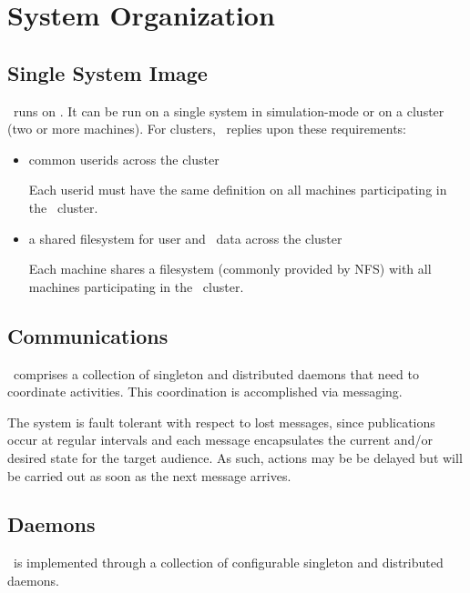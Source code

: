 \chapter{System Organization}

    \section{Single System Image}
    
    \varDUCC~runs on \varLinux. It can be run on a single system in simulation-mode
    or on a cluster (two or more machines). For clusters, \varDUCC~replies upon 
    these requirements:
    
    \begin{itemize}
      \item common userids across the cluster
      
      Each userid must have the same definition on all machines participating
      in the \varDUCC~cluster.
      
      \item a shared filesystem for user and \varDUCC~data across the cluster
      
      Each machine shares a filesystem (commonly provided by NFS) with all 
      machines participating in the \varDUCC~cluster.
      
    \end{itemize} 
    
    \section{Communications}
    
    \varDUCC~comprises a collection of singleton and distributed daemons that need
    to coordinate activities.  This coordination is accomplished via messaging.
    
    The system is fault tolerant with respect to lost messages, since
    publications occur at regular intervals and each message encapsulates
    the current and/or desired state for the target audience.
    As such, actions may be be delayed but will be carried out as soon as the
    next message arrives.
    
    \section{Daemons}
    
    \varDUCC~is implemented through a collection of configurable singleton 
    and distributed daemons.
    
